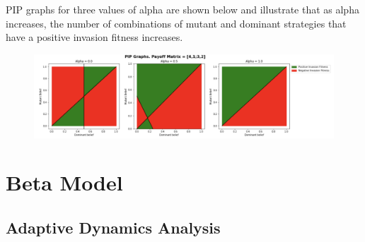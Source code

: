 \documentclass[]{llncs}
\begin{document}
PIP graphs for three values of alpha are shown below and illustrate that as alpha increases, the number of combinations of mutant and dominant strategies that have a positive invasion fitness increases. 

\begin{figure}
\centering
\includegraphics[width=15cm]{images/pip_alpha}
\end{figure}

\section{Beta Model}

\subsection{Adaptive Dynamics Analysis}
\end{document}
